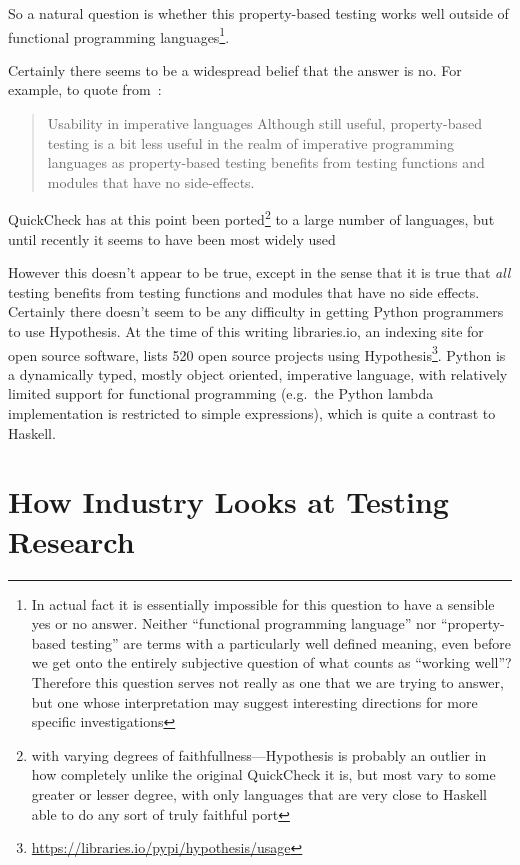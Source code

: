 So a natural question is whether this property-based testing works well outside of functional programming languages\footnote{
In actual fact it is essentially impossible for this question to have a sensible yes or no answer.
Neither ``functional programming language'' nor ``property-based testing'' are terms with a particularly well defined meaning,
even before we get onto the entirely subjective question of what counts as ``working well''?
Therefore this question serves not really as one that we are trying to answer,
but one whose interpretation may suggest interesting directions for more specific investigations
}.

Certainly there seems to be a widespread belief that the answer is no.
For example, to quote from~\cite{matela2017tools}:

\begin{quote}
Usability in imperative languages Although still useful, property-based testing is a
bit less useful in the realm of imperative programming languages as property-based testing
benefits from testing functions and modules that have no side-effects.
\end{quote}

QuickCheck has at this point been ported\footnote{with varying degrees of faithfullness---Hypothesis
is probably an outlier in how completely unlike the original QuickCheck it is,
but most vary to some greater or lesser degree,
with only languages that are very close to Haskell able to do any sort of truly faithful port} to a large number of languages,
but until recently it seems to have been most widely used

However this doesn't appear to be true,
except in the sense that it is true that \emph{all} testing benefits from testing functions and modules that have no side effects.
Certainly there doesn't seem to be any difficulty in getting Python programmers to use Hypothesis.
At the time of this writing libraries.io, an indexing site for open source software,
lists 520 open source projects using Hypothesis\footnote{\url{https://libraries.io/pypi/hypothesis/usage}}.
Python is a dynamically typed, mostly object oriented, imperative language,
with relatively limited support for functional programming (e.g.\ the Python lambda implementation is restricted to simple expressions),
which is quite a contrast to Haskell.

\chapter{How Industry Looks at Testing Research}

